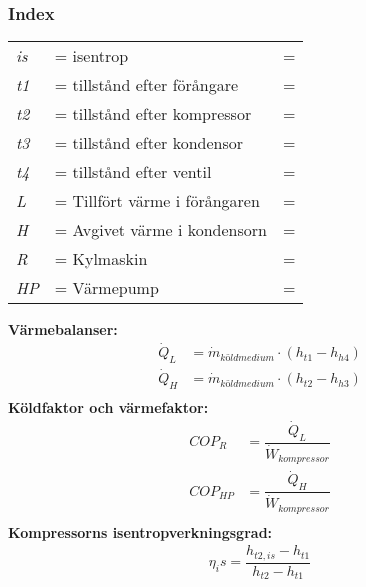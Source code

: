 \subsubsection*{Index}
	\begin{tabularx}{\linewidth} { l
	>{\raggedright\arraybackslash\hsize=1.5\hsize\linewidth=\hsize}X
	>{\raggedright\arraybackslash\hsize=0.5\hsize\linewidth=\hsize}X}
	\textit{is} & isentrop\\ 
	\textit{t1} & tillstånd efter förångare\\ 
	\textit{t2} & tillstånd efter kompressor\\ 
	\textit{t3} & tillstånd efter kondensor\\ 
	\textit{t4} & tillstånd efter ventil\\ 
	\textit{L} & Tillfört värme i förångaren\\ 
	\textit{H} & Avgivet värme i kondensorn\\ 
	\textit{R} & Kylmaskin\\ 
	\textit{HP} & Värmepump\\ 
	\end{tabularx}
	\textbf{Värmebalanser:}
	\begin{align*}
		{\dot{Q}}_{L} &  ={\dot{m}}_{\textit{köldmedium}}  \cdot (h_{t1} - h_{h4}) \\
		{\dot{Q}}_{H} &  ={\dot{m}}_{\textit{köldmedium}}  \cdot (h_{t2} - h_{h3}) \\
	\end{align*}
	\textbf{Köldfaktor och värmefaktor:}
	\begin{align*}
		\textit{COP}_{R}  & =  \dfrac{{\dot{Q}}_{L}}{{\dot{W}}_{kompressor}}  \\
		\textit{COP}_{HP}  & =  \dfrac{{\dot{Q}}_{H}}{{\dot{W}}_{kompressor}}  \\
	\end{align*}
	\textbf{Kompressorns isentropverkningsgrad:}
	\begin{align*}
		\eta_is=\dfrac{h_{t2,is}-h_{t1}}{h_{t2}-h_{t1}}
	\end{align*}
